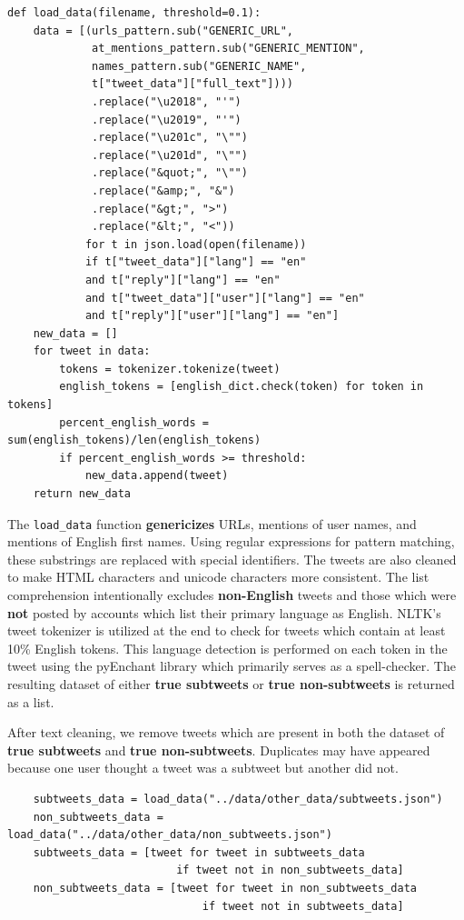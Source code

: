 \documentclass[11pt, twoside, reqno]{book}
\begin{document}
\begin{verbatim}
def load_data(filename, threshold=0.1):
    data = [(urls_pattern.sub("GENERIC_URL",
             at_mentions_pattern.sub("GENERIC_MENTION",
             names_pattern.sub("GENERIC_NAME",
             t["tweet_data"]["full_text"])))
             .replace("\u2018", "'")
             .replace("\u2019", "'")
             .replace("\u201c", "\"")
             .replace("\u201d", "\"")
             .replace("&quot;", "\"")
             .replace("&amp;", "&")
             .replace("&gt;", ">")
             .replace("&lt;", "<"))
            for t in json.load(open(filename))
            if t["tweet_data"]["lang"] == "en"
            and t["reply"]["lang"] == "en"
            and t["tweet_data"]["user"]["lang"] == "en"
            and t["reply"]["user"]["lang"] == "en"]
    new_data = []
    for tweet in data:
        tokens = tokenizer.tokenize(tweet)
        english_tokens = [english_dict.check(token) for token in tokens]
        percent_english_words = sum(english_tokens)/len(english_tokens)
        if percent_english_words >= threshold:
            new_data.append(tweet)
    return new_data
\end{verbatim}
\noindent
The \verb|load_data| function \textbf{genericizes} URLs, mentions of user names, and mentions of English first names. Using regular expressions for pattern matching, these substrings are replaced with special identifiers. The tweets are also cleaned to make HTML characters and unicode characters more consistent. The list comprehension intentionally excludes \textbf{non-English} tweets and those which were \textbf{not} posted by accounts which list their primary language as English. NLTK's tweet tokenizer is utilized at the end to check for tweets which contain at least 10\% English tokens. This language detection is performed on each token in the tweet using the pyEnchant library \cite{pyenchant} which primarily serves as a spell-checker. The resulting dataset of either \textbf{true subtweets} or \textbf{true non-subtweets} is returned as a list.

After text cleaning, we remove tweets which are present in both the dataset of \textbf{true subtweets} and \textbf{true non-subtweets}. Duplicates may have appeared because one user thought a tweet was a subtweet but another did not.

\begin{verbatim}
	subtweets_data = load_data("../data/other_data/subtweets.json")
	non_subtweets_data = load_data("../data/other_data/non_subtweets.json")
	subtweets_data = [tweet for tweet in subtweets_data 
                          if tweet not in non_subtweets_data]
	non_subtweets_data = [tweet for tweet in non_subtweets_data 
                              if tweet not in subtweets_data]
\end{verbatim}
\end{document}
